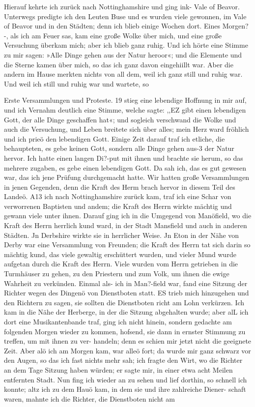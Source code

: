 Hierauf kehrte ich zurück nach Nottinghamshire und ging
ink- Vale of Beavor. Unterwegs predigte ich den Leuten Buse
und es wurden viele gewonnen, im Vale of Beavor und in den
Städten; denn ich blieb einige Wochen dort. Eines Morgen?-,
als ich am Feuer sas, kam eine große Wolke über mich, und eine
große Versuchung überkam mich; aber ich blieb ganz ruhig. Und
ich hörte eine Stimme zu mir sagen: »Alle Dinge gehen aus der
Natur heroor«; und die Elemente und die Sterne kamen über
mich, so das ich ganz davon eingehiillt war. Aber die andern
im Hause merkten nichts von all dem, weil ich ganz still und
ruhig war. Und weil ich still und ruhig war und wartete, so



Erste Versammlungen und Proteste. 19
stieg eine lebendige Hoffnung in mir auf, und ich Vernahm deutlich
eine Stimme, welche sagte: ,,EZ gibt einen lebendigen Gott, der
alle Dinge geschaffen hat«; und sogleich verschwand die Wolke
und auch die Versuchung, und Leben breitete sich über alles; mein
Herz ward fröhlich und ich prieö den lebendigen Gott. Einige
Zeit darauf traf ich etliche, die behaupteten, es gebe keinen Gott,
sondern alle Dinge gehen aus-3 der Natur hervor. Ich hatte einen
langen Di?-put mit ihnen und brachte sie herum, so das mehrere
zugaben, es gebe einen lebendigen Gott. Da sah ich, das es gut
gewesen war, das ich jene Prüfung durchgemacht hatte. Wir
hatten große Versammlungen in jenen Gegenden, denn die Kraft
des Herm brach hervor in diesem Teil des Landeö. A13 ich nach
Nottinghamshire zurück kam, traf ich eine Schar von verworrenen
Baptisten und andem; die Kraft des Herrn wirkte mächtig und
gewann viele unter ihnen. Darauf ging ich in die Umgegend von
Manöfield, wo die Kraft des Herrn herrlich kund ward, in der
Stadt Mansfield und auch in anderen Städten. Jn Derbshire
wirkte sie in herrlicher Weise. Jn Eton in der Nähe von Derby
war eine Versammlung von Freunden; die Kraft des Herrn tat sich
darin so mächtig kund, das viele gewaltig erschüttert wurden, und
vieler Mund wurde aufgetan durch die Kraft des Herrn. Viele wurden
vom Herrn getrieben in die Turmhäuser zu gehen, zu den Priestern
und zum Volk, um ihnen die ewige Wahrheit zu verkünden.
Einmal als- ich in Man?-field war, fand eine Sitzung der
Richter wegen des Dingenö von Dienstboten statt. ES trieb
mich hinzugehen und den Richtern zu sagen, sie sollten die
Dienstboten richt am Lohn verkürzen. Ich kam in die Nähe
der Herberge, in der die Sitzung abgehalten wurde; aber
alL ich dort eine Musikantenbande traf, ging ich nicht hinein,
sondern gedachte am folgenden Morgen wieder zu kommen, hofsend,
sie dann in ernster Stimmung zu treffen, um mit ihnen zu ver-
handeln; denn es schien mir jetzt nicht die geeignete Zeit. Aber
alö ich am Morgen kam, war alleö fort; da wurde mir ganz
schwarz vor den Augen, so das ich fast nichts mehr sah; ich fragte
den Wirt, wo die Richter an dem Tage Sitzung haben würden;
er sagte mir, in einer etwa acht Meilen entfernten Stadt. Nun
fing ich wieder an zu sehen und lief dorthin, so schnell ich konnte;
altz ich zu dem Hauö kam, in dem sie und ihre zahlreiche Diener-
schaft waren, mahnte ich die Richter, die Dienstboten nicht am



